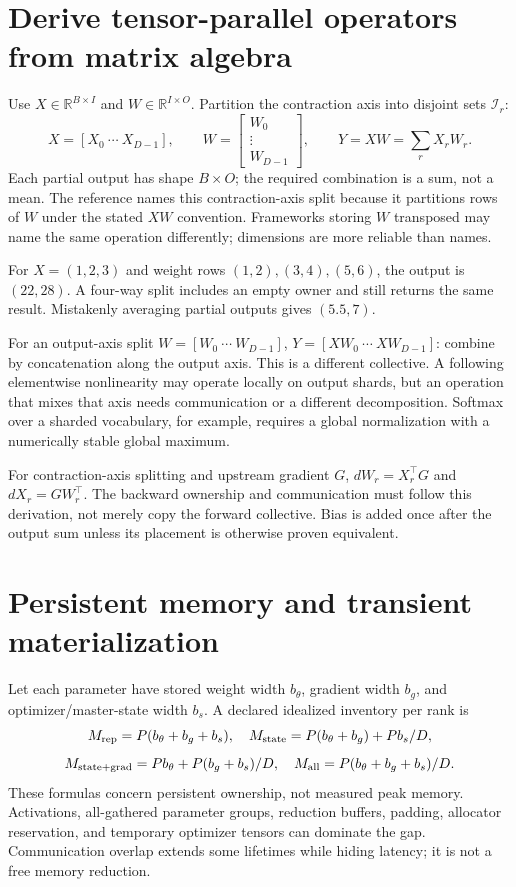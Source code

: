 \section{Derive tensor-parallel operators from matrix algebra}
Use $X\in\mathbb R^{B\times I}$ and $W\in\mathbb R^{I\times O}$.
Partition the contraction axis into disjoint sets $\mathcal I_r$:
\[
X=[X_0\ \cdots\ X_{D-1}],\qquad
W=\begin{bmatrix}W_0\\ \vdots\\ W_{D-1}\end{bmatrix},\qquad
Y=XW=\sum_rX_rW_r.
\]
Each partial output has shape $B\times O$; the required combination is a sum,
not a mean. The reference names this contraction-axis split
 because it partitions rows of $W$ under the stated
$XW$ convention. Frameworks storing $W$ transposed may name the same operation
differently; dimensions are more reliable than names.

For $X=(1,2,3)$ and weight rows $(1,2),(3,4),(5,6)$, the output is $(22,28)$.
A four-way split includes an empty owner and still returns the same result.
Mistakenly averaging partial outputs gives $(5.5,7)$.

For an output-axis split $W=[W_0\ \cdots\ W_{D-1}]$,
$Y=[XW_0\ \cdots\ XW_{D-1}]$: combine by concatenation along the output axis.
This is a different collective. A following elementwise nonlinearity may operate
locally on output shards, but an operation that mixes that axis needs communication
or a different decomposition. Softmax over a sharded vocabulary, for example,
requires a global normalization with a numerically stable global maximum.

For contraction-axis splitting and upstream gradient $G$,
$dW_r=X_r^\top G$ and $dX_r=G W_r^\top$.
The backward ownership and communication must follow this derivation, not merely
copy the forward collective. Bias is added once after the output sum unless its
placement is otherwise proven equivalent.

\section{Persistent memory and transient materialization}
Let each parameter have stored weight width $b_\theta$, gradient width $b_g$,
and optimizer/master-state width $b_s$. A declared idealized inventory per rank is
\[
M_{\rm rep}=P(b_\theta+b_g+b_s),\quad
M_{\rm state}=P(b_\theta+b_g)+Pb_s/D,
\]
\[
M_{\rm state+grad}=Pb_\theta+P(b_g+b_s)/D,\quad
M_{\rm all}=P(b_\theta+b_g+b_s)/D.
\]
These formulas concern persistent ownership, not measured peak memory.
Activations, all-gathered parameter groups, reduction buffers, padding,
allocator reservation, and temporary optimizer tensors can dominate the gap.
Communication overlap extends some lifetimes while hiding latency; it is not a
free memory reduction.

